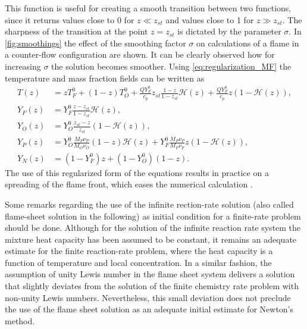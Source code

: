 This function is useful for creating a smooth transition between two functions, since it returns values close to 0 for $z \ll z_{st}$ and values close to 1 for $z \gg z_{st}$. The sharpness of the transition at the point $z = z_{st}$ is dictated by the parameter $\sigma$. In \cref{fig:smoothings} the effect of the smoothing factor $\sigma$ on calculations of a flame in a counter-flow configuration are shown. It can be clearly observed how for increasing $\sigma$ the solution becomes smoother. Using \cref{eq:regularization_MF} the temperature and mass fraction fields can be written as
\begin{subequations}
	\begin{align}
		T(z)   & = z T_F^0 + (1-z)T_O^0 + \frac{Q Y_F^0}{c_p} z_{st}\frac{1- z}{1-z_{st}}\mathcal{H}(z) +  \frac{Q Y_F^0}{c_p}z\left(1-\mathcal{H}(z)\right),  \label{eq:BS-TR} \\[1ex]
		Y_F(z) & = Y_F^0\frac{z - z_{st}}{1-z_{st}} \mathcal{H}(z), \label{eq:BS-YFR}                                                                                           \\[1ex]
		Y_O(z) & = Y_O^0 \frac{z_{st}-z}{z_{st}} (1-\mathcal{H}(z)), \label{eq:BS-YOR}                                                                                          \\[1ex]
		Y_P(z) & =  Y_O^0\frac{M_P\nu_P}{M_O\nu_O}(1-z)\mathcal{H}(z) +	Y_F^0\frac{M_P\nu_P}{M_F\nu_F}z (1-\mathcal{H}(z)), \label{eq:BS-YPR}                                   \\[1ex]
		Y_N(z) & = (1-Y_F^0)z + (1-Y_O^0)(1-z). \label{eq:BS-YNR}
	\end{align}
\end{subequations}
The use of this regularized form of the equations results in practice on a spreading of the flame front, which eases the numerical calculation \citep{braackAdaptiveFiniteElement1997}.

Some remarks regarding the use of the infinite rection-rate solution (also called flame-sheet solution in the following) as initial condition for a finite-rate problem should be done. Although for the solution of the infinite reaction rate system the mixture heat capacity has been assumed to be constant, it remains an adequate estimate for the finite reaction-rate problem, where the heat capacity is a function of temperature and local concentration. In a similar fashion, the assumption of unity Lewis number in the flame sheet system delivers a solution that slightly deviates from the solution of the finite chemistry rate problem with non-unity Lewis numbers. Nevertheless, this small deviation does not preclude the use of the flame sheet solution as an adequate initial estimate for Newton's method. 

